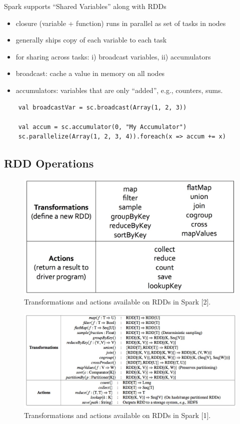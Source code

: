 \begin{frame}[fragile]
Spark supports ``Shared Variables'' along with RDDs
\begin{itemize}
  \item closure (variable + function) runs in parallel as set of tasks in nodes
  \item generally ships copy of each variable to each task
  \item for sharing across tasks: i) broadcast variables, ii) accumulators
  \item broadcast: cache a value in memory on all nodes
  \item accumulators: variables that are only ``added'', e.g., counters, sums.
\end{itemize}
\begin{lstlisting}
	val broadcastVar = sc.broadcast(Array(1, 2, 3))
	
	val accum = sc.accumulator(0, "My Accumulator")
	sc.parallelize(Array(1, 2, 3, 4)).foreach(x => accum += x)
\end{lstlisting}
\end{frame}

\subsection{RDD Operations}
\begin{frame}
\begin{figure}
\centering
\includegraphics[width=0.80\linewidth]{figures/rdd-operations.jpg}
\caption{Transformations and actions available on RDDs in Spark [2].}
\end{figure}
\end{frame}

\begin{frame}
\begin{figure}
\centering
\includegraphics[width=\linewidth]{figures/rdd-operations-details.jpg}
\caption{Transformations and actions available on RDDs in Spark [1].}
\end{figure}
\end{frame}

